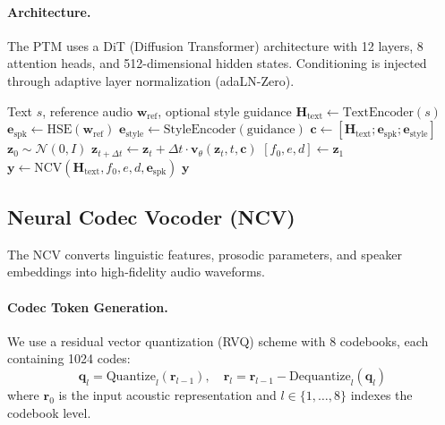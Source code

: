 \documentclass[11pt,a4paper]{article}
\begin{document}
\paragraph{Architecture.} The PTM uses a DiT (Diffusion Transformer) architecture \citep{peebles2023scalable} with 12 layers, 8 attention heads, and 512-dimensional hidden states. Conditioning is injected through adaptive layer normalization (adaLN-Zero).

\begin{algorithm}[t]
\caption{Zen-Voice Inference Pipeline}
\label{alg:inference}
\begin{algorithmic}[1]
\Require Text $s$, reference audio $\bm{w}_{\text{ref}}$, optional style guidance
\State $\bm{H}_{\text{text}} \leftarrow \text{TextEncoder}(s)$ 
\State $\bm{e}_{\text{spk}} \leftarrow \text{HSE}(\bm{w}_{\text{ref}})$ 
\State $\bm{e}_{\text{style}} \leftarrow \text{StyleEncoder}(\text{guidance})$ 
\State $\bm{c} \leftarrow [\bm{H}_{\text{text}}; \bm{e}_{\text{spk}}; \bm{e}_{\text{style}}]$ 
\State $\bm{z}_0 \sim \mathcal{N}(0, I)$ 
 
    \State $\bm{z}_{t+\Delta t} \leftarrow \bm{z}_t + \Delta t \cdot \bm{v}_\theta(\bm{z}_t, t, \bm{c})$
\EndFor
\State $[f_0, e, d] \leftarrow \bm{z}_1$ 
\State $\bm{y} \leftarrow \text{NCV}(\bm{H}_{\text{text}}, f_0, e, d, \bm{e}_{\text{spk}})$ 
\State \Return $\bm{y}$
\end{algorithmic}
\end{algorithm}

\subsection{Neural Codec Vocoder (NCV)}
\label{sec:ncv}

The NCV converts linguistic features, prosodic parameters, and speaker embeddings into high-fidelity audio waveforms.

\paragraph{Codec Token Generation.} We use a residual vector quantization (RVQ) scheme with 8 codebooks, each containing 1024 codes:
\begin{equation}
    \bm{q}_l = \text{Quantize}_l\left(\bm{r}_{l-1}\right), \quad \bm{r}_l = \bm{r}_{l-1} - \text{Dequantize}_l(\bm{q}_l)
\end{equation}
where $\bm{r}_0$ is the input acoustic representation and $l \in \{1, \ldots, 8\}$ indexes the codebook level.
\end{document}
